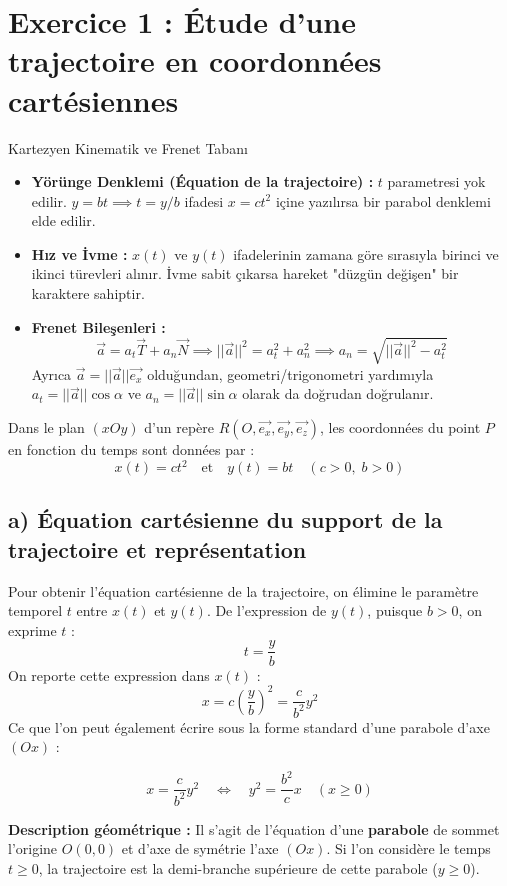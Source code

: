\documentclass[11pt,a4paper]{article}
\begin{document}
\section*{Exercice 1 : Étude d'une trajectoire en coordonnées cartésiennes}

\begin{theoriebox}{Kartezyen Kinematik ve Frenet Tabanı}
\begin{itemize}
    \item \textbf{Yörünge Denklemi (Équation de la trajectoire) :} $t$ parametresi yok edilir. $y = bt \implies t = y/b$ ifadesi $x = ct^2$ içine yazılırsa bir parabol denklemi elde edilir.
    \item \textbf{Hız ve İvme :} $x(t)$ ve $y(t)$ ifadelerinin zamana göre sırasıyla birinci ve ikinci türevleri alınır. İvme sabit çıkarsa hareket "düzgün değişen" bir karaktere sahiptir.
    \item \textbf{Frenet Bileşenleri :}
    $$ \vec{a} = a_t \vec{T} + a_n \vec{N} \implies ||\vec{a}||^2 = a_t^2 + a_n^2 \implies a_n = \sqrt{||\vec{a}||^2 - a_t^2} $$
    Ayrıca $\vec{a} = ||\vec{a}||\vec{e_x}$ olduğundan, geometri/trigonometri yardımıyla $a_t = ||\vec{a}||\cos\alpha$ ve $a_n = ||\vec{a}||\sin\alpha$ olarak da doğrudan doğrulanır.
\end{itemize}
\end{theoriebox}

Dans le plan $(xOy)$ d'un repère $R(O, \vec{e_x}, \vec{e_y}, \vec{e_z})$, les coordonnées du point $P$ en fonction du temps sont données par :
$$ x(t) = c t^2 \quad \text{et} \quad y(t) = b t \quad (c > 0, \; b > 0) $$

\subsection*{a) Équation cartésienne du support de la trajectoire et représentation}
Pour obtenir l'équation cartésienne de la trajectoire, on élimine le paramètre temporel $t$ entre $x(t)$ et $y(t)$.
De l'expression de $y(t)$, puisque $b > 0$, on exprime $t$ :
$$ t = \frac{y}{b} $$
On reporte cette expression dans $x(t)$ :
$$ x = c \left(\frac{y}{b}\right)^2 = \frac{c}{b^2} y^2 $$
Ce que l'on peut également écrire sous la forme standard d'une parabole d'axe $(Ox)$ :
\begin{sonucbox}
$$ x = \frac{c}{b^2} y^2 \quad \Longleftrightarrow \quad y^2 = \frac{b^2}{c} x \quad (x \ge 0) $$
\end{sonucbox}
\textbf{Description géométrique :} Il s'agit de l'équation d'une \textbf{parabole} de sommet l'origine $O(0,0)$ et d'axe de symétrie l'axe $(Ox)$. Si l'on considère le temps $t \ge 0$, la trajectoire est la demi-branche supérieure de cette parabole ($y \ge 0$).
\end{document}
